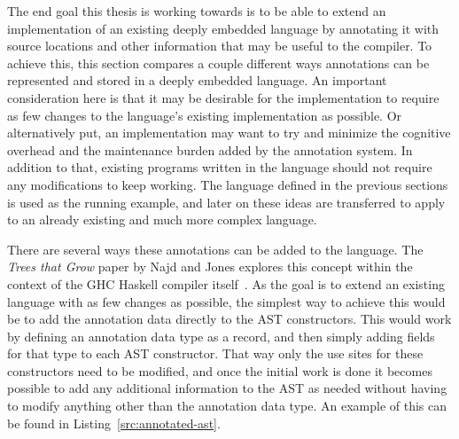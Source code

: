 \documentclass[fontsize=11pt,a4paper,parskip=half,numbers=noenddot]{scrartcl}
\begin{document}

The end goal this thesis is working towards is to be able to extend an
implementation of an existing deeply embedded language by annotating it with
source locations and other information that may be useful to the compiler. To
achieve this, this section compares a couple different ways annotations can be
represented and stored in a deeply embedded language. An important consideration
here is that it may be desirable for the implementation to require as few
changes to the language's existing implementation as possible. Or alternatively
put, an implementation may want to try and minimize the cognitive overhead and
the maintenance burden added by the annotation system. In addition to that,
existing programs written in the language should not require any modifications
to keep working. The language defined in the previous sections is used as the
running example, and later on these ideas are transferred to apply to an already
existing and much more complex language.

There are several ways these annotations can be added to the language. The
\emph{Trees that Grow} paper by Najd and Jones explores this concept within the
context of the GHC Haskell compiler itself~\cite{najd2017trees}. As the goal is
to extend an existing language with as few changes as possible, the simplest way
to achieve this would be to add the annotation data directly to the AST
constructors. This would work by defining an annotation data type as a record,
and then simply adding fields for that type to each AST constructor. That way
only the use sites for these constructors need to be modified, and once the
initial work is done it becomes possible to add any additional information to
the AST as needed without having to modify anything other than the annotation
data type. An example of this can be found in Listing~\ref{src:annotated-ast}.
\end{document}
